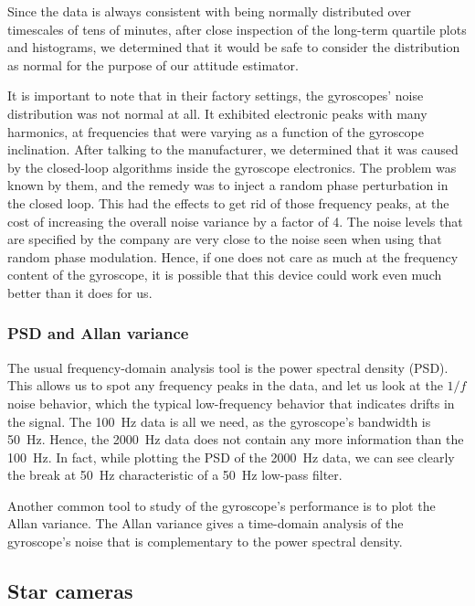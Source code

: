 Since the data is always consistent with being normally distributed over timescales of tens of minutes, after close inspection of the long-term quartile plots and histograms, we determined that it would be safe to consider the distribution as normal for the purpose of our attitude estimator. 

It is important to note that in their factory settings, the gyroscopes' noise distribution was not normal at all. It exhibited electronic peaks with many harmonics, at frequencies that were varying as a function of the gyroscope inclination. After talking to the manufacturer, we determined that it was caused by the closed-loop algorithms inside the gyroscope electronics. The problem was known by them, and the remedy was to inject a random phase perturbation in the closed loop. This had the effects to get rid of those frequency peaks, at the cost of increasing the overall noise variance by a factor of 4. The noise levels that are specified by the company are very close to the noise seen when using that random phase modulation. Hence, if one does not care as much at the frequency content of the gyroscope, it is possible that this device could work even much better than it does for us.

\subsubsection{PSD and Allan variance}

The usual frequency-domain analysis tool is the power spectral density (PSD). This allows us to spot any frequency peaks in the data, and let us look at the $1/f$ noise behavior, which the typical low-frequency behavior that indicates drifts in the signal. The 100~Hz data is all we need, as the gyroscope's bandwidth is 50~Hz. Hence, the 2000~Hz data does not contain any more information than the 100~Hz. In fact, while plotting the PSD of the 2000~Hz data, we can see clearly the break at 50~Hz characteristic of a 50~Hz low-pass filter.

Another common tool to study of the gyroscope's performance is to plot the Allan variance. The Allan variance gives a time-domain analysis of the gyroscope's noise that is complementary to the power spectral density.

\subsection{Star cameras}



